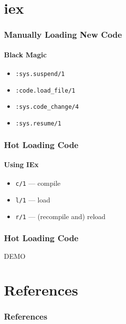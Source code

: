\documentclass{beamer}
\begin{document}
\section{iex}

\begin{frame}
\frametitle{Manually Loading New Code}
\framesubtitle{Black Magic}
\begin{itemize}
\item{\texttt{:sys.suspend/1}}
\item{\texttt{:code.load\_file/1}}
\item{\texttt{:sys.code\_change/4}}
\item{\texttt{:sys.resume/1}}
\end{itemize}
\end{frame}

\begin{frame}
\frametitle{Hot Loading Code}
\framesubtitle{Using IEx}
\begin{itemize}
\item{\texttt{c/1} --- compile}
\item{\texttt{l/1} --- load}
\item{\texttt{r/1} --- (recompile and) reload}
\end{itemize}
\end{frame}

\begin{frame}
\frametitle{Hot Loading Code}
\Huge{DEMO}
\end{frame}

\section*{References}
\begin{frame}[allowframebreaks]
\frametitle{References}
\nocite{*}
\renewcommand{\refname}{}


\end{frame}

\end{document}
